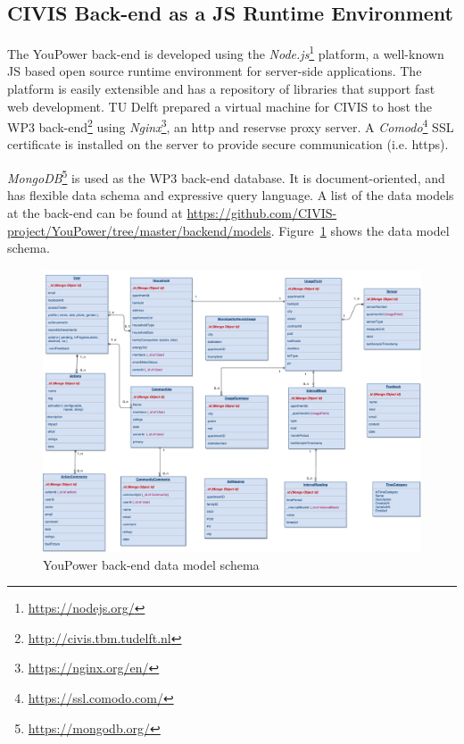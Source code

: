 
\subsection{CIVIS Back-end as a JS Runtime Environment}

The YouPower back-end is developed using the \textit{Node.js}\footnote{\url{https://nodejs.org/}} platform, a well-known JS based open source runtime environment for server-side applications. 
The platform is easily extensible and has a repository of libraries that support fast web development. 
% 
TU Delft prepared a virtual machine for CIVIS to host the WP3 back-end\footnote{\url{http://civis.tbm.tudelft.nl}}
using \textit{Nginx}\footnote{\url{https://nginx.org/en/}}, an http and reservse proxy server. 
% 
A \textit{Comodo}\footnote{\url{https://ssl.comodo.com/}} SSL certificate is installed on the server to provide secure communication (i.e. https). 

\textit{MongoDB}\footnote{\url{https://mongodb.org/}} is used as the WP3 back-end database. It is document-oriented, and has flexible data schema and expressive query language. 
A list of the data models at the back-end can be found at {\footnotesize\url{https://github.com/CIVIS-project/YouPower/tree/master/backend/models}}. 
Figure~\ref{fig:datamodel} shows the data model schema.
%
\begin{figure}
\centering
\includegraphics[height=.92\linewidth,angle=90]{img/7sdatamodel}
\caption{YouPower back-end data model schema}
\label{fig:datamodel}
\end{figure} 
% 

